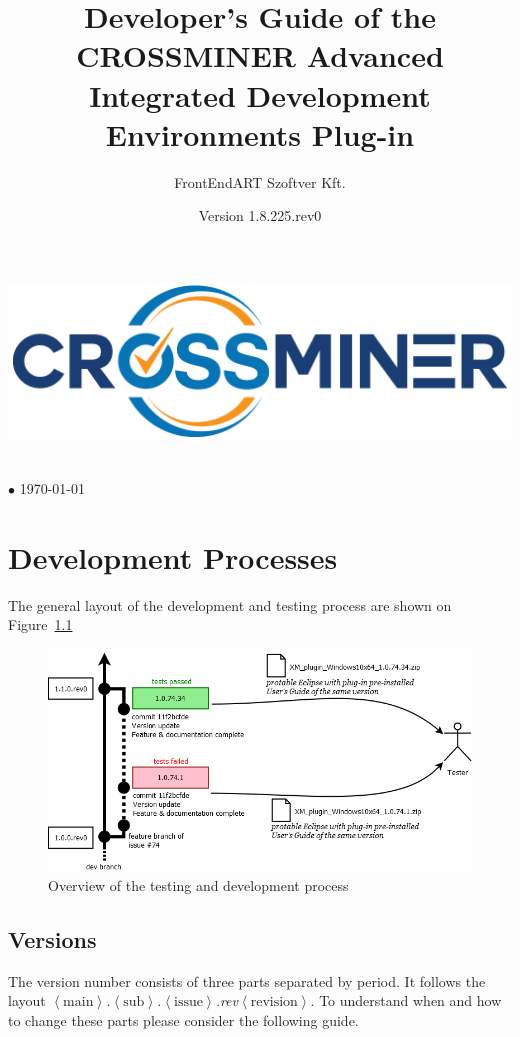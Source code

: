 \documentclass[11pt,a4paper]{book}
\author{FrontEndART Szoftver Kft.}
\title{Developer's Guide of the CROSSMINER Advanced Integrated Development Environments Plug-in}
\date{Version 1.8.225.rev0}
\makeatletter
\renewcommand{\maketitle}{
\vspace*{.1\textheight}
\begin{center}
	\includegraphics[width=.6\textwidth]{pic/CROSSMINER-logo-large.png}
\end{center}
\begin{center}
	\Huge\@title
\end{center}
\vfill
\begin{center}
	\large\@author\\\@date{} $\bullet$ \today
\end{center}
}
\newcommand{\placeholder}[1]{$\left\langle\text{#1}\right\rangle$}
\makeatother
\begin{document}
	
\begin{titlepage}
	\maketitle
\end{titlepage}

\chapter{Development Processes}

The general layout of the development and testing process are shown on Figure~\ref{fig:version}

\begin{figure}[h]
	\centering
	\includegraphics[width=\linewidth]{pic/version.png}
	\caption{Overview of the testing and development process}
	\label{fig:version}
\end{figure}


\section{Versions}
The version number consists of three parts separated by period. It follows the layout \emph{\placeholder{main}.\placeholder{sub}.\placeholder{issue}.rev\placeholder{revision}}. To understand when and how to change these parts please consider the following guide.
\end{document}
